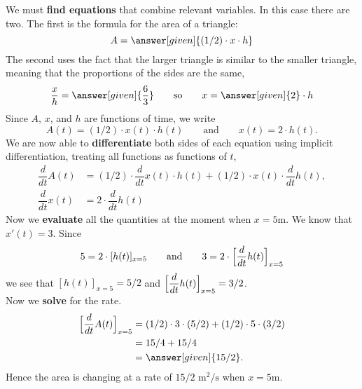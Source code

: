 \documentclass{ximera}
\begin{document}
\begin{example}
\begin{explanation}
    We must \textbf{find equations} that combine relevant
    variables. In this case there are two. The first is the formula
    for the area of a triangle:
    \[
    A = \answer[given]{(1/2) \cdot x \cdot h}
    \]
    The second uses the fact that the larger triangle is similar to
    the smaller triangle, meaning that the proportions of the sides
    are the same,
    \[
    \frac{x}{h} = \answer[given]{\frac{6}{3}}\qquad\text{so}\qquad x =
    \answer[given]{2}\cdot h
    \]
   Since $A$, $x$, and $h$ are functions of time, we write
    \[
    A(t) = (1/2) \cdot x(t) \cdot h(t) \qquad\text{and}\qquad x(t) =
    2\cdot h(t).
    \]
    We are now able to \textbf{differentiate} both sides of each equation using
    implicit differentiation, treating all functions as functions of
    $t$,
    \begin{align*}
    \dfrac{d}{dt}A(t) &= (1/2) \cdot\dfrac{d}{dt}x(t) \cdot h(t) +  (1/2) \cdot x(t) \cdot \dfrac{d}{dt}h(t),\\
     \dfrac{d}{dt}x(t) &= 2\cdot\dfrac{d}{dt}h(t)
    \end{align*}
    Now we \textbf{evaluate} all the quantities at the moment when $x=5$m.
   We know that $x'(t) = 3$. Since
    \[
    5 = 2\cdot [h(t)]_{x=5}\qquad\text{and}\qquad 3= 2\cdot \Bigl[\dfrac{d}{dt}h(t)\Bigr]_{x=5}
    \]
    we see that $ [h(t)]_{x=5} = 5/2$ and $ \Bigl[\dfrac{d}{dt}h(t)\Bigr]_{x=5} = 3/2$. \\
    Now we \textbf{solve} for the rate.
    \begin{align*}
    \Bigl[\dfrac{d}{dt}A(t)\Bigr]_{x=5}  &= (1/2) \cdot 3 \cdot (5/2) + (1/2) \cdot 5 \cdot (3/2)\\
      &= 15/4 + 15/4\\
      &= \answer[given]{15/2}.
    \end{align*}
    Hence the area is changing at a rate of $15/2$ $\text{m}^2/\text{s}$ when $x=5$m.
    
  \end{explanation}
\end{example}
\end{document}
